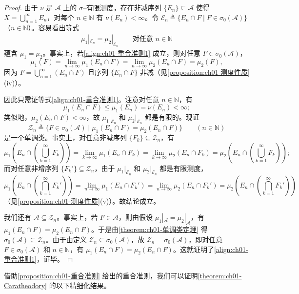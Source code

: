 \documentclass[../../main.tex]{subfiles}%
\begin{document}
\begin{proof}
由于 $\nu$ 是 $\mathcal{A}$ 上的 $\sigma$--有限测度，存在非减序列 $\{E_n\}\subseteq\mathcal{A}$ 使得 $X=\bigcup_{n=1}^\infty E_n$，对每个 $n\in\mathbb{N}$ 有 $\nu(E_n)<\infty$。令 $\mathcal{E}_n\triangleq \{E_n\cap F\mid F\in\sigma_0(\mathcal{A})\}$（$n\in\mathbb{N}$）。容易看出等式
\begin{align}
\mu_1|_{\mathcal{E}_n}=\mu_2|_{\mathcal{E}_n}\qquad\text{对任意 }n\in\mathbb{N} \label{align:ch01-重合准则1}
\end{align}
蕴含 $\mu_1=\mu_2$。事实上，若\eqref{align:ch01-重合准则1} 成立，则对任意 $F\in\sigma_0(\mathcal{A})$，
\[
\mu_1(F)=\lim_{n\to\infty}\mu_1(E_n\cap F)=\lim_{n\to\infty}\mu_2(E_n\cap F)=\mu_2(F),
\]
因为 $F=\bigcup_{n=1}^\infty(E_n\cap F)$ 且序列 $\{E_n\cap F\}$ 非减（见\cref{proposition:ch01-测度性质}(iv)）。

因此只需证等式\eqref{align:ch01-重合准则1}。注意对任意 $n\in\mathbb{N}$，有
\[
\mu_1(E_n\cap F)\leqslant\mu_1(E_n)=\nu(E_n)<\infty;
\]
类似地，$\mu_2(E_n\cap F)<\infty$，故 $\mu_1|_{\mathcal{E}_n}$ 和 $\mu_2|_{\mathcal{E}_n}$ 都是有限的。现证
\[
\mathcal{Z}_n\triangleq \{F\in\sigma_0(\mathcal{A})\mid\mu_1(E_n\cap F)=\mu_2(E_n\cap F)\}\qquad(n\in\mathbb{N})
\]
是一个单调类。事实上，对任意非减序列 $\{F_k\}\subseteq\mathcal{Z}_n$，有
\[
\mu_1\left(E_n\cap\left(\bigcup_{k=1}^\infty F_k\right)\right)=\lim_{k\to\infty}\mu_1(E_n\cap F_k)
=\lim_{k\to\infty}\mu_2(E_n\cap F_k)=\mu_2\left(E_n\cap\left(\bigcup_{k=1}^\infty F_k\right)\right);
\]
而对任意非增序列 $\{F_k'\}\subseteq\mathcal{Z}_n$，由于 $\mu_1|_{\mathcal{E}_n}$ 和 $\mu_2|_{\mathcal{E}_n}$ 都是有限测度，
\[
\mu_1\left(E_n\cap\left(\bigcap_{k=1}^\infty F_k'\right)\right)=\lim_{n\to\infty}\mu_1(E_n\cap F_k')
=\lim_{n\to\infty}\mu_2(E_n\cap F_k')=\mu_2\left(E_n\cap\left(\bigcap_{k=1}^\infty F_k'\right)\right)
\]
（见\cref{proposition:ch01-测度性质}(v)）。故结论成立。

我们还有 $\mathcal{A}\subseteq\mathcal{Z}_n$。事实上，若 $F\in\mathcal{A}$，则由假设 $\mu_1|_{\mathcal{A}}=\mu_2|_{\mathcal{A}}$，有 $\mu_1(E_n\cap F)=\mu_2(E_n\cap F)$。于是由\cref{theorem:ch01-单调类定理} 得 $\sigma_0(\mathcal{A})\subseteq\mathcal{Z}_n$。由于由定义 $\mathcal{Z}_n\subseteq\sigma_0(\mathcal{A})$，故 $\mathcal{Z}_n=\sigma_0(\mathcal{A})$，即对任意 $F\in\sigma_0(\mathcal{A})$ 和 $n\in\mathbb{N}$，有 $\mu_1(E_n\cap F)=\mu_2(E_n\cap F)$。这就证明了\eqref{align:ch01-重合准则1}，证毕。
\end{proof}

借助\cref{proposition:ch01-重合准则} 给出的重合准则，我们可以证明\cref{theorem:ch01-Caratheodory} 的以下精细化结果。
\end{document}
